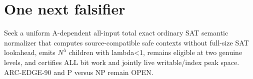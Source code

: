 \documentclass[11pt]{article}
\begin{document}
\section{One next falsifier}
Seek a uniform A-dependent all-input total exact ordinary SAT semantic normalizer that computes source-compatible safe contexts without full-size SAT lookahead, emits \(N^\lambda\) children with lambda<1, remains eligible at two genuine levels, and certifies ALL bit work and jointly live writable/index peak space. ARC-EDGE-90 and P versus NP remain OPEN.
\end{document}
